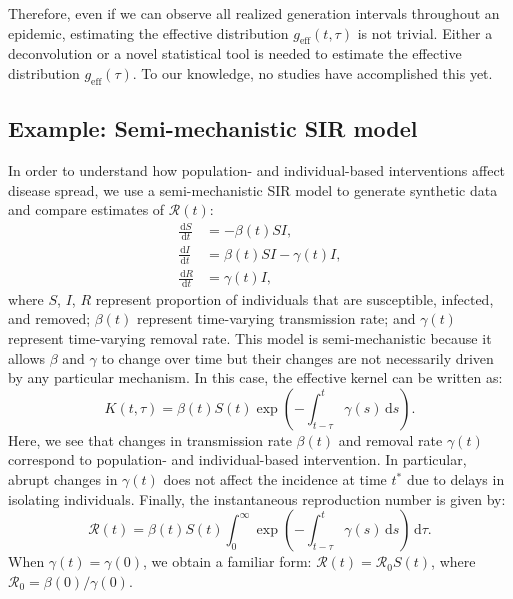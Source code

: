 \documentclass[12pt]{article}
\newcommand{\Rx}[1]{\ensuremath{{\mathcal R}_{#1}}\xspace}
\newcommand{\Ro}{\Rx{0}}
\newcommand{\RR}{\ensuremath{{\mathcal R}}\xspace}
\newcommand{\dd}[1]{\ensuremath{\, \mathrm{d}#1}}
\newcommand{\dtau}{\dd{\tau}}
\newcommand{\geff}{g_{\textrm{eff}}} %
\begin{document}
Therefore, even if we can observe all realized generation intervals throughout an epidemic, estimating the effective distribution $\geff(t, \tau)$ is not trivial.
Either a deconvolution or a novel statistical tool is needed to estimate the effective distribution $\geff(\tau)$.
To our knowledge, no studies have accomplished this yet.

\subsection{Example: Semi-mechanistic SIR model}

In order to understand how population- and individual-based interventions affect disease spread, we use a semi-mechanistic SIR model to generate synthetic data and compare estimates of $\RR(t)$:
\begin{align}
\frac{\dd{S}}{\dd{t}} &= - \beta(t)S I,\\
\frac{\dd{I}}{\dd{t}} &= \beta(t)S I - \gamma(t) I,\\
\frac{\dd{R}}{\dd{t}} &= \gamma(t) I,
\end{align}
where $S$, $I$, $R$ represent proportion of individuals that are susceptible, infected, and removed;
$\beta(t)$ represent time-varying transmission rate; and $\gamma(t)$ represent time-varying removal rate.
This model is semi-mechanistic because it allows $\beta$ and $\gamma$ to change over time but their changes are not necessarily driven by any particular mechanism.
In this case, the effective kernel can be written as:
\begin{equation}
K(t, \tau) = \beta(t) S(t) \exp\left(-\int_{t-\tau}^t \gamma(s) \dd{s} \right).
\end{equation}
Here, we see that changes in transmission rate $\beta(t)$ and removal rate $\gamma(t)$ correspond to population- and individual-based intervention.
In particular, abrupt changes in $\gamma(t)$ does not affect the incidence at time $t^\ast$ due to delays in isolating individuals.
Finally, the instantaneous reproduction number is given by:
\begin{equation}
\RR(t) = \beta(t) S(t) \int_0^\infty \exp\left(-\int_{t-\tau}^t \gamma(s) \dd{s} \right) \dtau.
\end{equation}
When $\gamma(t) = \gamma(0)$, we obtain a familiar form: $\RR(t) = \Ro S(t)$,
where $\Ro = \beta(0)/\gamma(0)$.
\end{document}
